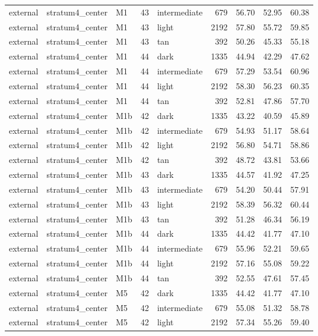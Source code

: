 \begin{tabular}{lllrlrrrr}
external & stratum4\_center & M1 & 43 & intermediate & 679 & 56.70 & 52.95 & 60.38 \\
external & stratum4\_center & M1 & 43 & light & 2192 & 57.80 & 55.72 & 59.85 \\
external & stratum4\_center & M1 & 43 & tan & 392 & 50.26 & 45.33 & 55.18 \\
external & stratum4\_center & M1 & 44 & dark & 1335 & 44.94 & 42.29 & 47.62 \\
external & stratum4\_center & M1 & 44 & intermediate & 679 & 57.29 & 53.54 & 60.96 \\
external & stratum4\_center & M1 & 44 & light & 2192 & 58.30 & 56.23 & 60.35 \\
external & stratum4\_center & M1 & 44 & tan & 392 & 52.81 & 47.86 & 57.70 \\
external & stratum4\_center & M1b & 42 & dark & 1335 & 43.22 & 40.59 & 45.89 \\
external & stratum4\_center & M1b & 42 & intermediate & 679 & 54.93 & 51.17 & 58.64 \\
external & stratum4\_center & M1b & 42 & light & 2192 & 56.80 & 54.71 & 58.86 \\
external & stratum4\_center & M1b & 42 & tan & 392 & 48.72 & 43.81 & 53.66 \\
external & stratum4\_center & M1b & 43 & dark & 1335 & 44.57 & 41.92 & 47.25 \\
external & stratum4\_center & M1b & 43 & intermediate & 679 & 54.20 & 50.44 & 57.91 \\
external & stratum4\_center & M1b & 43 & light & 2192 & 58.39 & 56.32 & 60.44 \\
external & stratum4\_center & M1b & 43 & tan & 392 & 51.28 & 46.34 & 56.19 \\
external & stratum4\_center & M1b & 44 & dark & 1335 & 44.42 & 41.77 & 47.10 \\
external & stratum4\_center & M1b & 44 & intermediate & 679 & 55.96 & 52.21 & 59.65 \\
external & stratum4\_center & M1b & 44 & light & 2192 & 57.16 & 55.08 & 59.22 \\
external & stratum4\_center & M1b & 44 & tan & 392 & 52.55 & 47.61 & 57.45 \\
external & stratum4\_center & M5 & 42 & dark & 1335 & 44.42 & 41.77 & 47.10 \\
external & stratum4\_center & M5 & 42 & intermediate & 679 & 55.08 & 51.32 & 58.78 \\
external & stratum4\_center & M5 & 42 & light & 2192 & 57.34 & 55.26 & 59.40 \\

\end{tabular}
